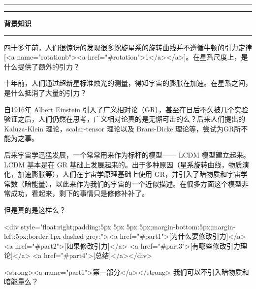 \documentclass[12pt,a4paper]{article}
\begin{document}
\hrule\vspace{1pt}\hrule
\begin{center}
\mbox{\Huge \bf 背景知识} \\
\end{center}
\hrule











































四十多年前，人们很惊讶的发现很多螺旋星系的旋转曲线并不遵循牛顿的引力定律[<a name="rotationb"><a href="#rotation">1</a></a>]。在星系尺度上，是什么提供了额外的引力？

十年前，人们通过超新星标准烛光的测量，得知宇宙的膨胀在加速。在星系之间，是什么抵消了大量的引力？

自1916年 Albert Einstein 引入了广义相对论（GR），甚至在日后不久被几个实验验证之后，人们仍然在思考，广义相对论真的是无懈可击的么？后来人们提出的 Kaluza-Klein 理论，scalar-tensor 理论以及 Brans-Dicke 理论等，尝试为GR所不能为之事。

后来宇宙学迅猛发展，一个常常用来作为标杆的模型—— LCDM 模型建立起来。LCDM 基本是在 GR 基础上发展起来的。出于多种原因（星系旋转曲线，物质演化，加速膨胀等），人们在宇宙学原理基础上使用 GR，并引入了暗物质和宇宙学常数（暗能量），以此来作为我们的宇宙的一个近似描述。在很多方面这个模型非常成功，看起来，剩下的事情只是修修补补了。

但是真的是这样么？

<div style="float:right;padding:5px 5px 5px 5px;margin-bottom:5px;margin-left:5px;border:1px dashed grey;"><a href="#part1">[为什么要修改引力]</a>
<a href="#part2">[如果修改引力]</a>
<a href="#part3">[有哪些修改引力理论]</a>
<a href="#part4">[总结]</a></div>


<strong><a name="part1">第一部分</a></strong> 我们可以不引入暗物质和暗能量么？
\end{document}
